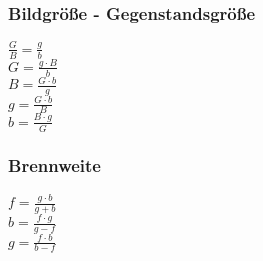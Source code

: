\subsubsection{Bildgröße - Gegenstandsgröße} 
\begin{minipage}{0.45\textwidth} 
$ \frac{G}{B} = \frac{g}{b} $\\ 
$ G = \frac{g\cdot B}{ b} $\\ 
$ B = \frac{G\cdot b}{ g} $\\ 
$ g = \frac{G\cdot b}{ B} $\\ 
$ b = \frac{B\cdot g}{ G} $\\ 
\end{minipage} 
\begin{minipage}{0.45\textwidth} 
 
\end{minipage} 
\subsubsection{Brennweite} 
\begin{minipage}{0.45\textwidth} 
$ f  = \frac{g\cdot b}{g+b} $\\ 
$ b  = \frac{f\cdot g}{g-f} $\\ 
$ g  = \frac{f\cdot b}{b-f} $\\ 
\end{minipage} 
\begin{minipage}{0.45\textwidth} 
 
\end{minipage} 
